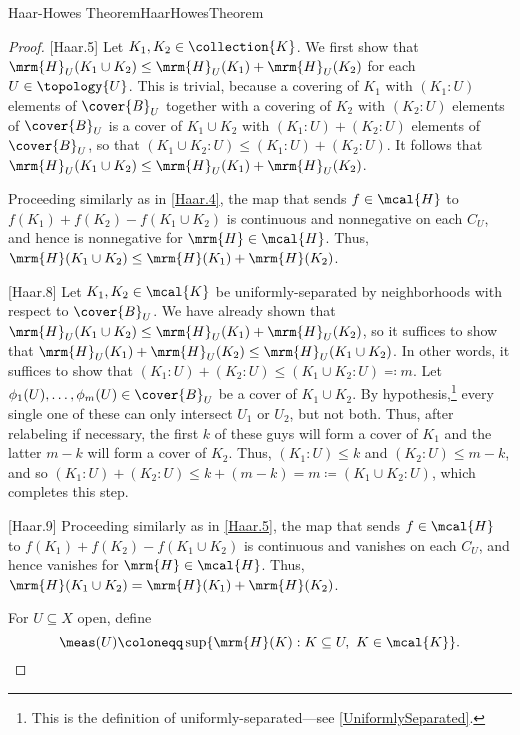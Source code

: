 \begin{thm}{Haar-Howes Theorem}{HaarHowesTheorem}
\begin{proof}
[Haar.5]
Let $K_1,K_2\in \collection{K}$.  We first show that $\mrm{H}_U(K_1\cup K_2)\leq \mrm{H}_U(K_1)+\mrm{H}_U(K_2)$ for each $U\in \topology{U}$.  This is trivial, because a covering of $K_1$ with $(K_1:U)$ elements of $\cover{B}_U$ together with a covering of $K_2$ with $(K_2:U)$ elements of $\cover{B}_U$ is a cover of $K_1\cup K_2$ with $(K_1:U)+(K_2:U)$ elements of $\cover{B}_U$, so that $(K_1\cup K_2:U)\leq (K_1:U)+(K_2:U)$.  It follows that $\mrm{H}_U(K_1\cup K_2)\leq \mrm{H}_U(K_1)+\mrm{H}_U(K_2)$.

Proceeding similarly as in \cref{Haar.4}, the map that sends $f\in \mcal{H}$ to $f(K_1)+f(K_2)-f(K_1\cup K_2)$ is continuous and nonnegative on each $C_U$, and hence is nonnegative for $\mrm{H}\in \mcal{H}$.  Thus, $\mrm{H}(K_1\cup K_2)\leq \mrm{H}(K_1)+\mrm{H}(K_2)$.

[Haar.8]
Let $K_1,K_2\in \mcal{K}$ be uniformly-separated by neighborhoods with respect to $\cover{B}_U$.  We have already shown that $\mrm{H}_U(K_1\cup K_2)\leq \mrm{H}_U(K_1)+\mrm{H}_U(K_2)$, so it suffices to show that $\mrm{H}_U(K_1)+\mrm{H}_U(K_2)\leq \mrm{H}_U(K_1\cup K_2)$.  In other words, it suffices to show that $(K_1:U)+(K_2:U)\leq (K_1\cup K_2:U)\eqqcolon m$.  Let $\phi _1(U),\ldots ,\phi _m(U)\in \cover{B}_U$ be a cover of $K_1\cup K_2$.  By hypothesis,\footnote{This is the definition of uniformly-separated---see \cref{UniformlySeparated}.} every single one of these can only intersect $U_1$ or $U_2$, but not both.  Thus, after relabeling if necessary, the first $k$ of these guys will form a cover of $K_1$ and the latter $m-k$ will form a cover of $K_2$.  Thus, $(K_1:U)\leq k$ and $(K_2:U)\leq m-k$, and so $(K_1:U)+(K_2:U)\leq k+(m-k)=m\coloneqq (K_1\cup K_2:U)$, which completes this step.

[Haar.9]
Proceeding similarly as in \cref{Haar.5}, the map that sends $f\in \mcal{H}$ to $f(K_1)+f(K_2)-f(K_1\cup K_2)$ is continuous and vanishes on each $C_U$, and hence vanishes for $\mrm{H}\in \mcal{H}$.  Thus, $\mrm{H}(K_1\cup K_2)=\mrm{H}(K_1)+\mrm{H}(K_2)$.

For $U\subseteq X$ open, define
\begin{equation}\label{5.1.46}
\meas (U)\coloneqq \sup \{ \mrm{H}(K):K\subseteq U,\ K\in \mcal{K}\} .
\end{equation}


\end{proof}
\end{thm}
